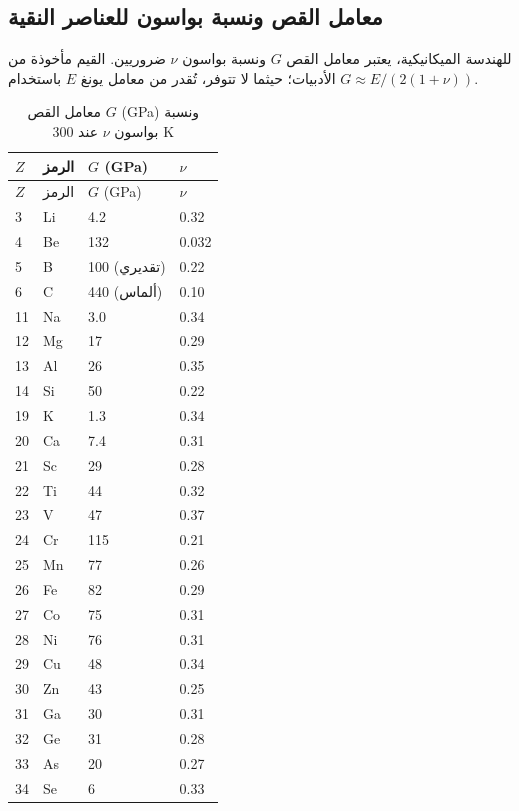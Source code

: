 \documentclass[11pt,a4paper]{article}
\begin{document}
\begin{otherlanguage}{arabic}
		\subsection{معامل القص ونسبة بواسون للعناصر النقية}
		\label{subsec:elastic-constants}
		
		للهندسة الميكانيكية، يعتبر معامل القص \(G\) ونسبة بواسون \(\nu\) ضروريين. القيم مأخوذة من الأدبيات؛ حيثما لا تتوفر، تُقدر من معامل يونغ \(E\) باستخدام \(G \approx E/(2(1+\nu))\).
		
		\begin{longtable}{p{0.6cm}p{1.2cm}p{1.5cm}p{1.5cm}}
			\caption{معامل القص \(G\) (GPa) ونسبة بواسون \(\nu\) عند 300 K} \label{tab:elastic-constants-all} \\
			\toprule
			\(Z\) & الرمز & \(G\) (GPa) & \(\nu\) \\
			\midrule
			\endfirsthead
			\toprule
			\(Z\) & الرمز & \(G\) (GPa) & \(\nu\) \\
			\midrule
			\endhead
			3  & Li & 4.2 & 0.32 \\
			4  & Be & 132 & 0.032 \\
			5  & B  & 100 (تقديري) & 0.22 \\
			6  & C  & 440 (ألماس) & 0.10 \\
			11 & Na & 3.0 & 0.34 \\
			12 & Mg & 17 & 0.29 \\
			13 & Al & 26 & 0.35 \\
			14 & Si & 50 & 0.22 \\
			19 & K  & 1.3 & 0.34 \\
			20 & Ca & 7.4 & 0.31 \\
			21 & Sc & 29 & 0.28 \\
			22 & Ti & 44 & 0.32 \\
			23 & V  & 47 & 0.37 \\
			24 & Cr & 115 & 0.21 \\
			25 & Mn & 77 & 0.26 \\
			26 & Fe & 82 & 0.29 \\
			27 & Co & 75 & 0.31 \\
			28 & Ni & 76 & 0.31 \\
			29 & Cu & 48 & 0.34 \\
			30 & Zn & 43 & 0.25 \\
			31 & Ga & 30 & 0.31 \\
			32 & Ge & 31 & 0.28 \\
			33 & As & 20 & 0.27 \\
			34 & Se & 6 & 0.33 \\

\end{longtable}
\end{otherlanguage}
\end{document}
